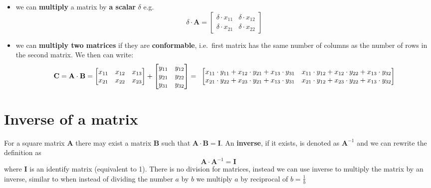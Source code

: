\documentclass[
]{book}
\providecommand{\tightlist}{%
  \setlength{\itemsep}{0pt}\setlength{\parskip}{0pt}}
\theoremstyle{definition}
\theoremstyle{definition}
\theoremstyle{definition}
\theoremstyle{remark}
\begin{document}
\begin{itemize}
\tightlist
\item
  we can \textbf{multiply} a matrix by \textbf{a scalar} \(\delta\) e.g.~\[\delta \cdot \mathbf{A} = \begin{bmatrix}
  \delta \cdot x_{11} & \delta \cdot x_{12}   \\
  \delta \cdot x_{21} & \delta \cdot x_{22} 
  \end{bmatrix}\]
\end{itemize}

\begin{itemize}
\tightlist
\item
  we can \textbf{multiply two matrices} if they are \textbf{conformable}, i.e.~first matrix has the same number of columns as the number of rows in the second matrix. We then can write:
  \[\mathbf{C} = \mathbf{A} \cdot \mathbf{B}  = \begin{bmatrix}
  x_{11} & x_{12} & x_{13}  \\
  x_{21} & x_{22} & x_{23}
  \end{bmatrix} + \begin{bmatrix}
  y_{11} & y_{12}   \\
  y_{21} & y_{22}  \\
  y_{31} & y_{32}
  \end{bmatrix} = \\\ 
  \begin{bmatrix}
  x_{11} \cdot y_{11} + x_{12} \cdot y_{21} + x_{13} \cdot y_{31}  & x_{11} \cdot y_{12} + x_{12} \cdot y_{22} + x_{13} \cdot y_{32}  \\
  x_{21} \cdot y_{22} + x_{23} \cdot y_{21} + x_{13} \cdot y_{31} & x_{21} \cdot y_{12} + x_{23} \cdot y_{22} + x_{13} \cdot y_{32}
  \end{bmatrix}\]
\end{itemize}

\hypertarget{inverse-of-a-matrix}{%
\section{Inverse of a matrix}\label{inverse-of-a-matrix}}

For a square matrix \(\mathbf{A}\) there may exist a matrix \(\mathbf{B}\) such that \(\mathbf{A} \cdot \mathbf{B} = \mathbf{I}\). An \textbf{inverse}, if it exists, is denoted as \(\mathbf{A}^{-1}\) and we can rewrite the definition as \[\mathbf{A} \cdot \mathbf{A}^{-1} = \mathbf{I}\] where \(\mathbf{I}\) is an identify matrix (equivalent to 1). There is no division for matrices, instead we can use inverse to multiply the matrix by an inverse, similar to when instead of dividing the number \(a\) by \(b\) we multiply \(a\) by reciprocal of \(b = \frac{1}{b}\)
\end{document}
